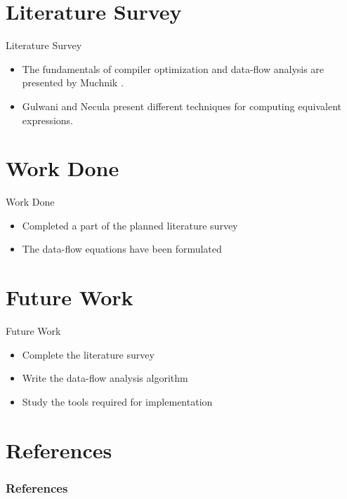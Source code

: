 \documentclass{beamer}
\begin{document}
\section{Literature Survey}
\begin{frame}{Literature Survey}
\begin{itemize}
	\item The fundamentals of compiler optimization and data-flow analysis
		are presented by Muchnik  \cite{rfc3286}.
	\item Gulwani and Necula \cite{rfc4960} present different techniques
		for computing equivalent expressions.
\end{itemize}
\end{frame}

\section{Work Done}
\begin{frame}{Work Done}
\begin{itemize}
	\item Completed a part of the planned literature survey
	\item The data-flow equations have been formulated
\end{itemize}
\end{frame}

\section{Future Work}
\begin{frame}{Future Work}
\begin{itemize}
	\item Complete the literature survey
	\item Write the data-flow analysis algorithm
	\item Study the tools required for implementation
\end{itemize}
\end{frame}


\section{References}

\begin{frame}[allowframebreaks]
\frametitle<presentation>{References}
\printbibliography
\end{frame}
\end{document}
